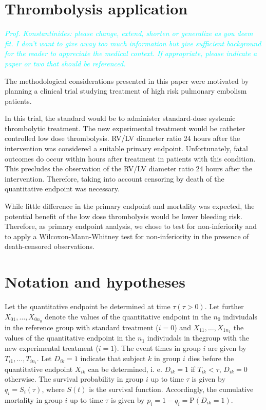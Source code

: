 \documentclass[bimj,fleqn]{w-art}\usepackage[]{graphicx}\usepackage[]{color}
\theoremstyle{plain}
\theoremstyle{definition}
\begin{document}
\section{Thrombolysis application}
\label{sec:ThrombolysisApplication}
\textcolor{cyan}{\textit{Prof. Konstantinides: please change, extend, shorten or generalize as
you deem fit. I don't want to give away too much information but give sufficient
background for the reader to appreciate the medical context. If appropriate,
please indicate a paper or two that should be referenced.}}

The methodological considerations presented in this paper were motivated by
planning a clinical trial studying treatment of high risk pulmonary embolism
patients.

In this trial, the standard would be to administer standard-dose systemic
thrombolytic treatment. The new experimental treatment would be catheter
controlled low dose thrombolysis. RV/LV diameter ratio 24 hours after the
intervention was considered a suitable primary endpoint. Unfortunately, fatal
outcomes do occur within hours after treatment in patients with this condition.
This precludes the observation of the RV/LV diameter ratio 24 hours after the
intervention. Therefore, taking into account censoring by death of the
quantitative endpoint was necessary.

While little difference in the primary endpoint and mortality was expected,
the potential benefit of the low dose thrombolysis would be lower bleeding
risk. Therefore, as primary endpoint analysis, we chose to test for
non-inferiority and to apply a Wilcoxon-Mann-Whitney test for non-inferiority
in the presence of death-censored observations.

\section{Notation and hypotheses}
\label{sec:Notation}
Let the quantitative endpoint be determined at time $\tau (\tau > 0)$. Let
further $X_{01}, \ldots, X_{0n_0}$ denote the values of the quantitative endpoint
in the $n_0$ indiviudals in the reference group with standard treatment ($i=0$)
and $X_{11}, \ldots, X_{1n_1}$ the values of the quantitative endpoint in the
$n_1$ indiviudals in thegroup with the new experimental treatment ($i=1$).
The event times in group $i$ are given by $T_{i1}, \ldots, T_{in_i}$. Let
$D_{ik} = 1$ indicate that subject $k$ in group $i$ dies before the
quantitative endpoint $X_{ik}$ can be determined, i. e. $D_{ik} = 1$ if
$T_{ik} < \tau $, $D_{ik} = 0$ otherwise. The survival probability in group
$i$ up to time $\tau$ is given by $q_i = S_i(\tau)$, where $S(t)$ is the survival function.
  Accordingly, the cumulative mortality in group $i$ up to time $\tau$ is given by
$p_i = 1 - q_i = \text{P}(D_{ik} = 1)$.
\end{document}
